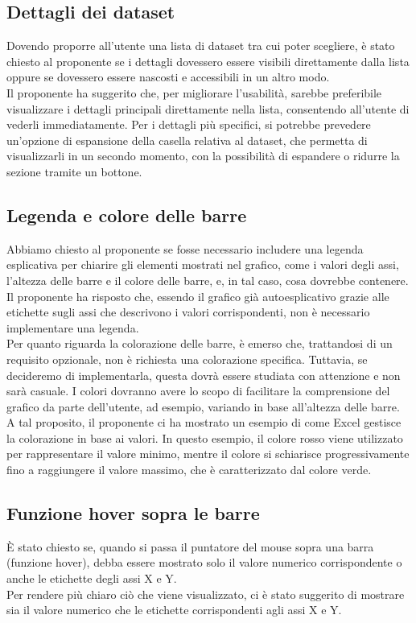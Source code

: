 \subsection{Dettagli dei dataset}
Dovendo proporre all'utente una lista di dataset tra cui poter scegliere, è stato chiesto al proponente se i dettagli dovessero essere visibili direttamente dalla lista oppure se dovessero essere nascosti e accessibili in un altro modo.\\
Il proponente ha suggerito che, per migliorare l'usabilità, sarebbe preferibile visualizzare i dettagli principali direttamente nella lista, consentendo all'utente di vederli immediatamente. Per i dettagli più specifici, si potrebbe prevedere un'opzione di espansione della casella relativa al dataset, che permetta di visualizzarli in un secondo momento, con la possibilità di espandere o ridurre la sezione tramite un bottone.
\subsection{Legenda e colore delle barre}  
Abbiamo chiesto al proponente se fosse necessario includere una legenda esplicativa per chiarire gli elementi mostrati nel grafico, come i valori degli assi, l'altezza delle barre e il colore delle barre, e, in tal caso, cosa dovrebbe contenere.\\
Il proponente ha risposto che, essendo il grafico già autoesplicativo grazie alle etichette sugli assi che descrivono i valori corrispondenti, non è necessario implementare una legenda.  
\\Per quanto riguarda la colorazione delle barre, è emerso che, trattandosi di un requisito opzionale, non è richiesta una colorazione specifica. Tuttavia, se decideremo di implementarla, questa dovrà essere studiata con attenzione e non sarà casuale. I colori dovranno avere lo scopo di facilitare la comprensione del grafico da parte dell'utente, ad esempio, variando in base all'altezza delle barre.\\
A tal proposito, il proponente ci ha mostrato un esempio di come Excel gestisce la colorazione in base ai valori. In questo esempio, il colore rosso viene utilizzato per rappresentare il valore minimo, mentre il colore si schiarisce progressivamente fino a raggiungere il valore massimo, che è caratterizzato dal colore verde.
\subsection{Funzione hover sopra le barre}
È stato chiesto se, quando si passa il puntatore del mouse sopra una barra (funzione hover), debba essere mostrato solo il valore numerico corrispondente o anche le etichette degli assi X e Y.\\
Per rendere più chiaro ciò che viene visualizzato, ci è stato suggerito di mostrare sia il valore numerico che le etichette corrispondenti agli assi X e Y.
